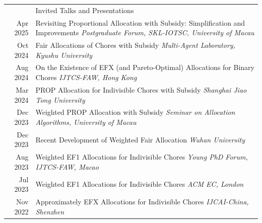 \documentclass[letterpaper, 11pt]{article}
\newcommand{\headingfont}{\Large\color{OliveGreen}}
\newenvironment{SectionTable}[1]{
	\renewcommand*{\arraystretch}{1.2}
	\setlength{\tabcolsep}{8pt}
	\begin{longtable}{Rp{6.2in}} & #1 \\}
{\end{longtable}\vspace{-.7cm}}
\begin{document}
\begin{SectionTable}{\headingfont Invited Talks and Presentations}

Apr 2025&
Revisiting Proportional Allocation with Subsidy: Simplification and Improvements \newline
\textit{Postgraduate Forum, SKL-IOTSC, University of Macau} \\

Oct 2024 &
Fair Allocations of Chores with Subsidy \newline
\textit{Multi-Agent Laboratory, Kyushu University} \\

Aug 2024 &
On the Existence of EFX (and Pareto-Optimal) Allocations for Binary Chores\newline
\textit{IJTCS-FAW, Hong Kong} \\

Mar 2024 &
PROP Allocation for Indivisible Chores with Subsidy \newline
\textit{Shanghai Jiao Tong University} \\

Dec 2023 &
Weighted PROP Allocation with Subsidy \newline
\textit{Seminar on Allocation Algorithms, University of Macau} \\

Dec 2023 &
Recent Development of Weighted Fair Allocation \newline
\textit{Wuhan University} \\

Aug 2023 &
Weighted EF1 Allocations for Indivisible Chores \newline
\textit{Young PhD Forum, IJTCS-FAW, Macao} \\

Jul 2023 &
Weighted EF1 Allocations for Indivisible Chores \newline
\textit{ACM EC, London} \\

Nov 2022 &
Approximately EFX Allocations for Indivisible Chores \newline
\textit{IJCAI-China, Shenzhen} \\

\end{SectionTable}


\end{document}
